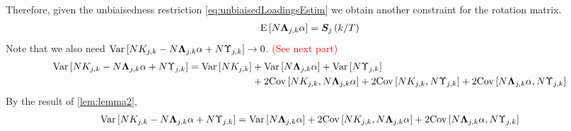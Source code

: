 \documentclass[main_document.tex]{subfiles}
\begin{document}
Therefore, given the unbiaisedness restriction \eqref{eq:unbiaisedLoadingsEstim} we obtain another constraint for the rotation matrix. 
\begin{align}
	\mathrm{E}\left[N\bm{\Lambda}_{j,k}\alpha\right] = \bm{S}_{j}\left(k/T\right) \label{eq:rotationExpectationConstraint}
\end{align}
Note that we also need $\mathrm{Var}\left[N K_{j,k} - N\bm{\Lambda}_{j,k}\alpha + N\Upsilon_{j,k}\right] \to 0$. \textcolor{red}{(See next part)}
\begin{align*}
	\mathrm{Var}\left[N K_{j,k} - N\bm{\Lambda}_{j,k}\alpha + N\Upsilon_{j,k}\right] = \mathrm{Var}\left[N K_{j,k}\right] &+ \mathrm{Var}\left[N \bm{\Lambda}_{j,k} \alpha\right] + \mathrm{Var}\left[N \Upsilon_{j,k}\right] \\ &+ 2 \mathrm{Cov}\left[N K_{j,k},N \bm{\Lambda}_{j,k} \alpha\right] + 2 \mathrm{Cov}\left[N K_{j,k},N \Upsilon_{j,k}\right] + 2\mathrm{Cov}\left[N \bm{\Lambda}_{j,k} \alpha,N \Upsilon_{j,k}\right]
\end{align*}
By the result of \ref{lem:lemma2},
\begin{align} \label{eq:varWithAlpha}
	\mathrm{Var}\left[N K_{j,k} - N\bm{\Lambda}_{j,k}\alpha + N\Upsilon_{j,k}\right] = \mathrm{Var}\left[N \bm{\Lambda}_{j,k} \alpha\right] + 2 \mathrm{Cov}\left[N K_{j,k},N \bm{\Lambda}_{j,k} \alpha\right] + 2\mathrm{Cov}\left[N \bm{\Lambda}_{j,k} \alpha,N \Upsilon_{j,k}\right]
\end{align}
\end{document}
